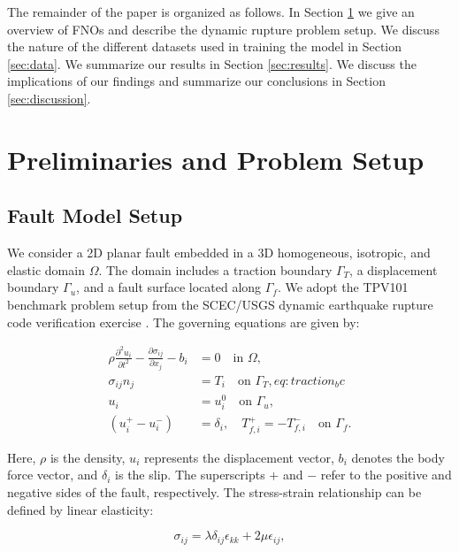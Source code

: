 \documentclass[draft]{agujournal2019}
\begin{document}
The remainder of the paper is organized as follows. In Section \ref{sec:methodology} we give an overview of FNOs and describe the dynamic rupture problem setup. We discuss the nature of the different datasets used in training the model in Section \ref{sec:data}. We summarize our results in Section \ref{sec:results}. We discuss the implications of our findings and summarize our conclusions in Section \ref{sec:discussion}.

\section{Preliminaries and Problem Setup}
\label{sec:methodology}

 \subsection{Fault Model Setup}
\label{sec:fault_model}

We consider a 2D planar fault embedded in a 3D homogeneous, isotropic, and elastic domain \( \Omega \). The domain includes a traction boundary \( \Gamma_T \), a displacement boundary \( \Gamma_u \), and a fault surface located along \( \Gamma_f \). We adopt the TPV101 benchmark problem setup from the SCEC/USGS dynamic earthquake rupture code verification exercise \cite{harris2018suite, harris2009scec, kammer2021uguca}. The governing equations are given by:

\begin{align}
\rho \frac{\partial^2 u_i}{\partial t^2} - \frac{\partial \sigma_{ij}}{\partial x_j} - b_i &= 0 \quad \text{in } \Omega,  \label{eq:momentum_balance} \\
\sigma_{ij} n_j &= T_i \quad \text{on } \Gamma_T, {eq:traction_bc} \\
u_i &= u_i^0 \quad \text{on } \Gamma_u, \label{eq:disp_bc}\\
(u_i^+ - u_i^-) &= \delta_i, \quad T_{f,i}^+ = -T_{f,i}^- \quad \text{on } \Gamma_f. \label{eq:fault_bc}
\end{align}

Here, \( \rho \) is the density, \( u_i \) represents the displacement vector, \( b_i \) denotes the body force vector, and \( \delta_i \) is the slip. The superscripts \( + \) and \( - \) refer to the positive and negative sides of the fault, respectively. The stress-strain relationship can be defined by linear elasticity:

\begin{equation}
\sigma_{ij} = \lambda \delta_{ij} \epsilon_{kk} + 2\mu \epsilon_{ij},
\end{equation}
\end{document}
